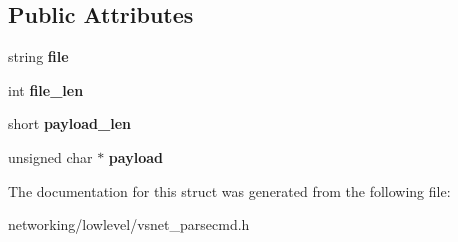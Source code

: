 \subsection*{Public Attributes}
\begin{DoxyCompactItemize}
\item 
string {\bfseries file}\hypertarget{structVsnetDownload_1_1Adapter_1_1DownloadFirstFragment_ac490ab23ff56fc90597fca62297ce903}{}\label{structVsnetDownload_1_1Adapter_1_1DownloadFirstFragment_ac490ab23ff56fc90597fca62297ce903}

\item 
int {\bfseries file\+\_\+len}\hypertarget{structVsnetDownload_1_1Adapter_1_1DownloadFirstFragment_a15fa66848dde0878d9bc789886fe2ef0}{}\label{structVsnetDownload_1_1Adapter_1_1DownloadFirstFragment_a15fa66848dde0878d9bc789886fe2ef0}

\item 
short {\bfseries payload\+\_\+len}\hypertarget{structVsnetDownload_1_1Adapter_1_1DownloadFirstFragment_a7fc62e1399519bd1624253c90613de70}{}\label{structVsnetDownload_1_1Adapter_1_1DownloadFirstFragment_a7fc62e1399519bd1624253c90613de70}

\item 
unsigned char $\ast$ {\bfseries payload}\hypertarget{structVsnetDownload_1_1Adapter_1_1DownloadFirstFragment_aed2b901f4e980d94e1dd99d91ac717fa}{}\label{structVsnetDownload_1_1Adapter_1_1DownloadFirstFragment_aed2b901f4e980d94e1dd99d91ac717fa}

\end{DoxyCompactItemize}


The documentation for this struct was generated from the following file\+:\begin{DoxyCompactItemize}
\item 
networking/lowlevel/vsnet\+\_\+parsecmd.\+h\end{DoxyCompactItemize}
